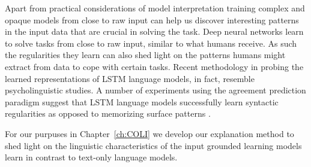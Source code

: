 Apart from practical considerations of model interpretation training complex and opaque models
from close to raw input can help us discover interesting patterns in the input data that
are crucial in solving the task.
Deep neural networks learn to solve tasks from close to raw input, similar to
what humans receive. As such the regularities they learn can also shed light on the patterns
humans might extract from data to cope with certain tasks.
Recent methodology in probing the learned representations of LSTM language models,
in fact, resemble psycholinguistic studies.
A number of experiments using the agreement prediction paradigm
\citep{bock1991broken} suggest that LSTM language models successfully learn
syntactic regularities as opposed to memorizing surface patterns
\citep{linzen2016assessing,enguehard2017exploring,bernardy2017using,gulordava2018colorless}.

For our purpuses in Chapter~\ref{ch:COLI} we develop our explanation method to
shed light on the linguistic characteristics of the input grounded learning
models learn in contrast to text-only language models.






